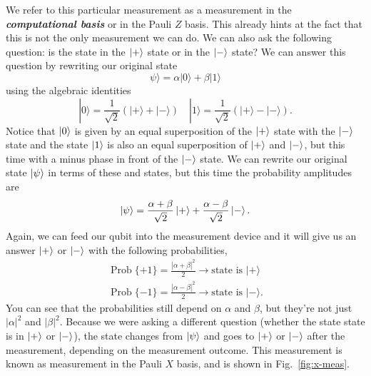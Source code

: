 We refer to this particular measurement as a measurement in the \textbf{\emph{computational basis}} or in the Pauli $Z$ basis. This already hints at the fact that this is not the only measurement we can do. We can also ask the following question: is the state in the $\left| + \right\rangle$ state or in the $\left| - \right\rangle$ state? We can answer this question by rewriting our original state
\begin{equation}
    \psi\rangle=\alpha|0\rangle+\beta|1\rangle
    \label{eq:superposition_basisZ}
\end{equation}
using the algebraic identities
\begin{equation}
|0\rangle=\frac{1}{\sqrt{2}}(|+\rangle+|-\rangle) \quad|1\rangle=\frac{1}{\sqrt{2}}(|+\rangle-|-\rangle).
\end{equation}
Notice that $\left| 0 \right\rangle$ is given by an equal superposition of the $\left| + \right\rangle$ state with the $\left| - \right\rangle$ state and the state $\left| 1 \right\rangle$ is also an equal superposition of $\left| + \right\rangle$ and $\left| - \right\rangle$, but this time with a minus phase in front of the $\left| - \right\rangle$ state. We can rewrite our original state $\left| \psi \right\rangle$ in terms of these \ket{+} and \ket{-} states, but this time the probability amplitudes are
\begin{equation}
    \left| \psi \right\rangle=\frac{\alpha+\beta}{\sqrt{2}}\left| + \right\rangle+\frac{\alpha-\beta}{\sqrt{2}}\left| - \right\rangle.
    \label{eq:superposition_basisX}
\end{equation}
Again, we can feed our qubit into the measurement device and it will give us an answer $\left| + \right\rangle$ or $\left| - \right\rangle$ with the following probabilities,
\begin{align}
\label{eq:plus-measurement}
\operatorname{Prob}\{+1\}=\frac{|\alpha+\beta|^2}{2} \rightarrow \textrm{state is } |+\rangle \\
\label{eq:minus-measurement}
\operatorname{Prob}\{-1\}=\frac{|\alpha-\beta|^2}{2} \rightarrow \textrm{state is } |-\rangle.
\end{align}
You can see that the probabilities still depend on $\alpha$ and $\beta$, but they're not just $|\alpha|^2$ and $|\beta|^2$.
Because we were asking a different question (whether the state state is in $\left| + \right\rangle$ or $\left| - \right\rangle$), the state changes from $\left| \psi \right\rangle$ and goes to $\left| + \right\rangle$ or $\left| - \right\rangle$ after the measurement, depending on the measurement outcome. This measurement is known as measurement in the Pauli $X$ basis, and is shown in Fig.~\ref{fig:x-meas}.

